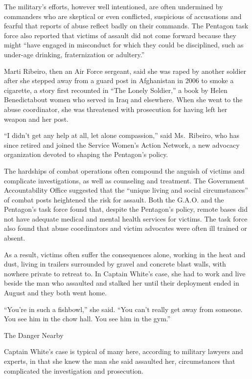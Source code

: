﻿\documentclass[12pt]{article}
\begin{document}
The military's efforts, however well intentioned, are often undermined by commanders who are
skeptical or even conflicted, suspicious of accusations and fearful that reports of abuse reflect
badly on their commands. The Pentagon task force also reported that victims of assault did not come
forward because they might ``have engaged in misconduct for which they could be disciplined, such as
under-age drinking, fraternization or adultery.''

Marti Ribeiro, then an Air Force sergeant, said she was raped by another soldier after she stepped
away from a guard post in Afghanistan in 2006 to smoke a cigarette, a story first recounted in ``The
Lonely Soldier,'' a book by Helen Benedictabout women who served in Iraq and elsewhere. When she
went to the abuse coordinator, she was threatened with prosecution for having left her weapon and
her post.

``I didn't get any help at all, let alone compassion,'' said Ms.~Ribeiro, who has since retired and
joined the Service Women's Action Network, a new advocacy organization devoted to shaping the
Pentagon's policy.

The hardships of combat operations often compound the anguish of victims and complicate
investigations, as well as counseling and treatment. The Government Accountability Office suggested
that the ``unique living and social circumstances'' of combat posts heightened the risk for assault.
Both the G.A.O. and the Pentagon's task force found that, despite the Pentagon's policy, remote
bases did not have adequate medical and mental health services for victims. The task force also
found that abuse coordinators and victim advocates were often ill trained or absent.

As a result, victims often suffer the consequences alone, working in the heat and dust, living in
trailers surrounded by gravel and concrete blast walls, with nowhere private to retreat to. In
Captain White's case, she had to work and live beside the man who assaulted and stalked her until
their deployment ended in August and they both went home.

``You're in such a fishbowl,'' she said. ``You can't really get away from someone. You see him in
the chow hall. You see him in the gym.''

The Danger Nearby

Captain White's case is typical of many here, according to military lawyers and experts, in that she
knew the man she said assaulted her, circumstances that complicated the investigation and
prosecution.
\end{document}
